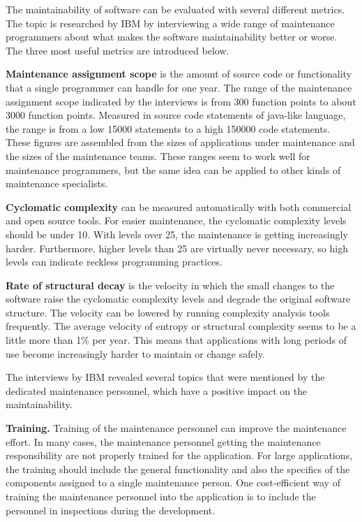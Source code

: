 The maintainability of software can be evaluated with several different metrics. The topic is researched by IBM by interviewing a wide range of maintenance programmers about what makes the software maintainability better or worse. The three most useful metrics are introduced below.

\textbf{Maintenance assignment scope} is the amount of source code or functionality that a single programmer can handle for one year. The range of the maintenance assignment scope indicated by the interviews is from 300 function points to about 3000 function points. Measured in source code statements of java-like language, the range is from a low 15000 statements to a high 150000 code statements. These figures are assembled from the sizes of applications under maintenance and the sizes of the maintenance teams. These ranges seem to work well for maintenance programmers, but the same idea can be applied to other kinds of maintenance specialists.

\textbf{Cyclomatic complexity} can be measured automatically with both commercial and open source tools. For easier maintenance, the cyclomatic complexity levels should be under 10. With levels over 25, the maintenance is getting increasingly harder. Furthermore, higher levels than 25 are virtually never necessary, so high levels can indicate reckless programming practices.

\textbf{Rate of structural decay} is the velocity in which the small changes to the software raise the cyclomatic complexity levels and degrade the original software structure. The velocity can be lowered by running complexity analysis tools frequently. The average velocity of entropy or structural complexity seems to be a little more than 1\% per year. This means that applications with long periods of use become increasingly harder to maintain or change safely.

The interviews by IBM revealed several topics that were mentioned by the dedicated maintenance personnel, which have a positive impact on the maintainability.

\textbf{Training.} Training of the maintenance personnel can improve the maintenance effort. In many cases, the maintenance personnel getting the maintenance responsibility are not properly trained for the application. For large applications, the training should include the general functionality and also the specifics of the components assigned to a single maintenance person. One cost-efficient way of training the maintenance personnel into the application is to include the personnel in inspections during the development.

